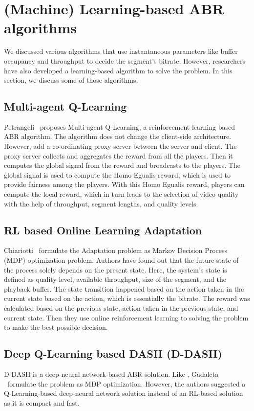 \section{(Machine) Learning-based ABR algorithms}
We discussed various algorithms that use instantaneous parameters like buffer occupancy and throughput to decide the segment's bitrate. However, researchers have also developed a learning-based algorithm to solve the problem. In this section, we discuss some of those algorithms.

\subsection{Multi-agent Q-Learning}
Petrangeli \etal\ proposes Multi-agent Q-Learning\cite{6838245}, a reinforcement-learning based ABR algorithm. The algorithm does not change the client-side architecture. However, add a co-ordinating proxy server between the server and client. The proxy server collects and aggregates the reward from all the players. Then it computes the global signal from the reward and broadcasts to the players. The global signal is used to compute the Homo Egualis\cite{10.5555/1402298.1402344} reward, which is used to provide fairness among the players. With this Homo Egualis reward, players can compute the local reward, which in turn leads to the selection of video quality with the help of throughput, segment lengths, and quality levels.

\subsection{RL based Online Learning Adaptation}
Chiariotti \etal\ formulate the Adaptation problem as Markov Decision Process (MDP)\cite{P-1066} optimization problem\cite{10.1145/2910017.2910603}. Authors have found out that the future state of the process solely depends on the present state. Here, the system's state is defined as quality level, available throughput, size of the segment, and the playback buffer. The state transition happened based on the action taken in the current state based on the action, which is essentially the bitrate. The reward was calculated based on the previous state, action taken in the previous state, and current state. Then they use online reinforcement learning to solving the problem to make the best possible decision.

\subsection{Deep Q-Learning based DASH (D-DASH)}
D-DASH\cite{8048013} is a deep-neural network-based ABR solution. Like \cite{10.1145/2910017.2910603}, Gadaleta \etal\ formulate the problem as MDP optimization. However, the authors suggested a Q-Learning-based deep-neural network solution instead of an RL-based solution as it is compact and fast.

